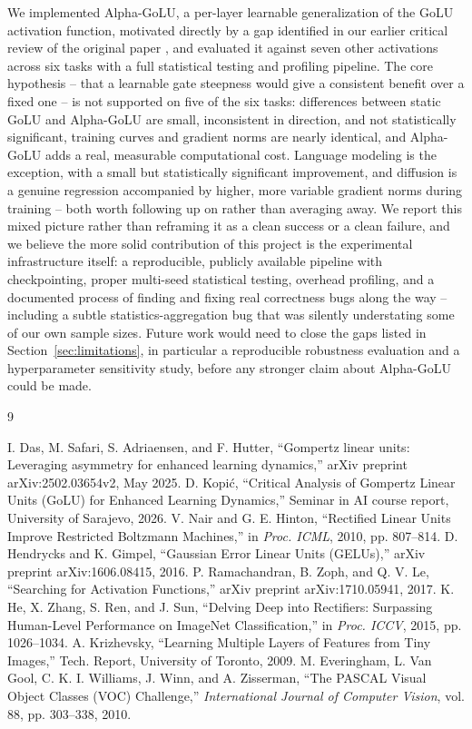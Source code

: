 \documentclass[conference]{IEEEtran}
\begin{document}
We implemented Alpha-GoLU, a per-layer learnable generalization of the GoLU activation function, motivated directly by a gap identified in our earlier critical review of the original paper \cite{kopic2026critical}, and evaluated it against seven other activations across six tasks with a full statistical testing and profiling pipeline. The core hypothesis -- that a learnable gate steepness would give a consistent benefit over a fixed one -- is not supported on five of the six tasks: differences between static GoLU and Alpha-GoLU are small, inconsistent in direction, and not statistically significant, training curves and gradient norms are nearly identical, and Alpha-GoLU adds a real, measurable computational cost. Language modeling is the exception, with a small but statistically significant improvement, and diffusion is a genuine regression accompanied by higher, more variable gradient norms during training -- both worth following up on rather than averaging away. We report this mixed picture rather than reframing it as a clean success or a clean failure, and we believe the more solid contribution of this project is the experimental infrastructure itself: a reproducible, publicly available pipeline with checkpointing, proper multi-seed statistical testing, overhead profiling, and a documented process of finding and fixing real correctness bugs along the way -- including a subtle statistics-aggregation bug that was silently understating some of our own sample sizes. Future work would need to close the gaps listed in Section~\ref{sec:limitations}, in particular a reproducible robustness evaluation and a hyperparameter sensitivity study, before any stronger claim about Alpha-GoLU could be made.

\begin{thebibliography}{9}

 I. Das, M. Safari, S. Adriaensen, and F. Hutter, ``Gompertz linear units: Leveraging asymmetry for enhanced learning dynamics,'' arXiv preprint arXiv:2502.03654v2, May 2025.
 D. Kopi\'{c}, ``Critical Analysis of Gompertz Linear Units (GoLU) for Enhanced Learning Dynamics,'' Seminar in AI course report, University of Sarajevo, 2026.
 V. Nair and G. E. Hinton, ``Rectified Linear Units Improve Restricted Boltzmann Machines,'' in \textit{Proc. ICML}, 2010, pp. 807--814.
 D. Hendrycks and K. Gimpel, ``Gaussian Error Linear Units (GELUs),'' arXiv preprint arXiv:1606.08415, 2016.
 P. Ramachandran, B. Zoph, and Q. V. Le, ``Searching for Activation Functions,'' arXiv preprint arXiv:1710.05941, 2017.
 K. He, X. Zhang, S. Ren, and J. Sun, ``Delving Deep into Rectifiers: Surpassing Human-Level Performance on ImageNet Classification,'' in \textit{Proc. ICCV}, 2015, pp. 1026--1034.
 A. Krizhevsky, ``Learning Multiple Layers of Features from Tiny Images,'' Tech. Report, University of Toronto, 2009.
 M. Everingham, L. Van Gool, C. K. I. Williams, J. Winn, and A. Zisserman, ``The PASCAL Visual Object Classes (VOC) Challenge,'' \textit{International Journal of Computer Vision}, vol. 88, pp. 303--338, 2010.

\end{thebibliography}
\end{document}
